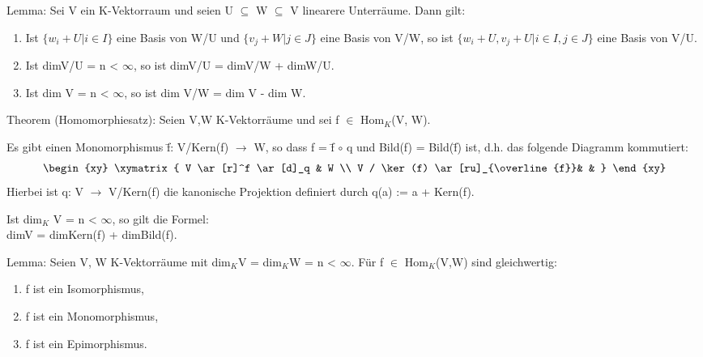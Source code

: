 Lemma: Sei V ein K-Vektorraum und seien U $\subseteq$ W $\subseteq$ V linearere Unterräume. Dann gilt:
\begin{enumerate}
\item Ist $\{w_i + U | i \in I\}$ eine Basis von W/U und $\{v_j + W | j \in J\}$ eine Basis von V/W, so ist $\{w_i +U, v_j +U | i \in I, j \in J\}$ eine Basis von V/U.
\item Ist dimV/U = n < $\infty$, so ist dimV/U = dimV/W + dimW/U.
\item Ist dim V = n < $\infty$, so ist dim V/W = dim V - dim W.
\end{enumerate}

Theorem (Homomorphiesatz): Seien V,W K-Vektorräume und sei f $\in$ Hom$_K$(V, W).
\begin{compactenum}
\item Es gibt einen Monomorphismus \={f}: V/Kern(f) $\to$ W, so dass f = \={f} $\circ$ q und Bild(f) = Bild(\={f}) ist, d.h. das folgende Diagramm kommutiert:
\begin{align*}
\begin{xy}
  \xymatrix{
      V \ar[r]^f \ar[d]_q &  W \\
      V / \ker(f) \ar[ru]_{\overline{f}}& &
  }
\end{xy}
\end{align*}
Hierbei ist q: V $\to$ V/Kern(f) die kanonische Projektion definiert durch q(a) := a + Kern(f).
\item Ist dim$_K$ V = n < $\infty$, so gilt die Formel: \\
dimV = dimKern(f) + dimBild(f).
\end{compactenum}

Lemma: Seien V, W K-Vektorräume mit dim$_K$V = dim$_K$W = n < $\infty$. Für f $\in$ Hom$_K$(V,W) sind gleichwertig:
\begin{enumerate}
\item f ist ein Isomorphismus,
\item f ist ein Monomorphismus, 
\item f ist ein Epimorphismus.
\end{enumerate}


